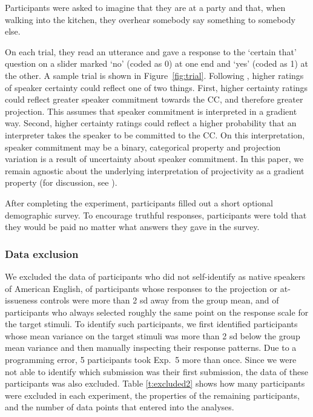 \documentclass[times,linguex,xcolor]{glossa}
\begin{document}
            Participants were asked to imagine that they are at a party and that, when walking into the kitchen, they overhear somebody say something to somebody else.
            
            On each trial, they read an utterance and gave a response to the `certain that' question on a slider marked `no' (coded as 0) at one end and `yes' (coded as 1) at the other. A sample trial %
            is shown in Figure~\ref{fig:trial}.            
            Following \citealt{tonhauser_how_2018}, higher ratings of speaker certainty could reflect one of two things. First, higher certainty ratings could reflect greater speaker commitment towards the CC, and therefore greater projection. This assumes that speaker commitment is interpreted in a gradient way. Second, higher certainty ratings could reflect a higher probability that an interpreter takes the speaker to be committed to the CC.  On this interpretation, speaker commitment may be a binary, categorical property and projection variation is a result of uncertainty about speaker commitment. In this paper, we remain agnostic about the underlying interpretation of projectivity as a gradient property (for discussion, see  \citealt{grove_factivity_2023}).
            
 After completing the experiment, participants filled out a short optional demographic survey. To encourage truthful responses, participants were told that they would be paid no matter what answers they gave in the survey.

  \subsubsection{Data exclusion}
  
We excluded the data of participants who did not self-identify as native speakers of American
English, of participants whose responses to the projection or at-issueness controls were more than 2 sd away from the group mean, and of participants who always selected roughly the same point on the response scale for the target stimuli. To identify such participants, we first identified participants whose mean variance on the target stimuli was more than 2 sd below the group mean variance and then manually inspecting their response patterns. Due to a programming error, 5 participants took Exp.~5 more than once. Since we were not able to identify which submission was their first submission, the data of these participants was also excluded. Table \ref{t:excluded2} shows how many participants were excluded in each experiment, the properties of the remaining participants, and the number of data points that entered into the analyses.
\end{document}
